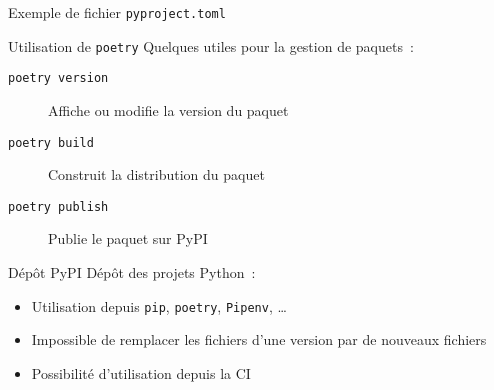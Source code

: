 \begin{frame}{Exemple de fichier \texttt{pyproject.toml}}
\end{frame}

\begin{frame}{Utilisation de \texttt{poetry}}
  Quelques  utiles pour la gestion de paquets~:
  \begin{description}
    \item[\texttt{poetry version}] Affiche ou modifie la version du paquet
    \item[\texttt{poetry build}] Construit la distribution du paquet
    \item[\texttt{poetry publish}] Publie le paquet sur PyPI
  \end{description}
\end{frame}

\begin{frame}{Dépôt PyPI}
  Dépôt des projets Python~:
  \begin{itemize}
    \item Utilisation depuis \texttt{pip}, \texttt{poetry}, \texttt{Pipenv}, …
    \item Impossible de remplacer les fichiers d'une version par de nouveaux fichiers
    \item Possibilité d'utilisation depuis la CI
  \end{itemize}
\end{frame}
